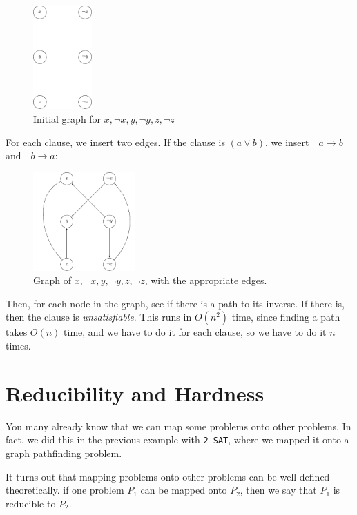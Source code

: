\begin{figure}[H]
  \centering
  \includegraphics[width=0.2\textwidth]{diagrams/graph9}
  \caption{Initial graph for $x, \neg x, y, \neg y, z, \neg z$}
  \label{fig:graph-9}
\end{figure}

For each clause, we insert two edges. If the clause is $(a \vee b)$, we insert
$\neg a \rightarrow b$ and $\neg b \rightarrow a$:

\begin{figure}[H]
  \centering
  \includegraphics[width=0.35\textwidth]{diagrams/graph10}
  \caption{Graph of $x, \neg x, y, \neg y, z, \neg z$, with the appropriate
  edges.}
  \label{fig:graph-10}
\end{figure}

Then, for each node in the graph, see if there is a path to its inverse. If
there is, then the clause is \textit{unsatisfiable}. This runs in $O(n^2)$ time,
since finding a path takes $O(n)$ time, and we have to do it for each clause, so
we have to do it $n$ times.

\section{Reducibility and Hardness}
\label{sec:reduce-and-hard}

You many already know that we can map some problems onto other problems. In
fact, we did this in the previous example with \texttt{2-SAT}, where we mapped
it onto a graph pathfinding problem.

It turns out that mapping problems onto other problems can be well defined
theoretically. if one problem $P_1$ can be mapped onto $P_2$, then we say that
$P_1$ is reducible to $P_2$.

